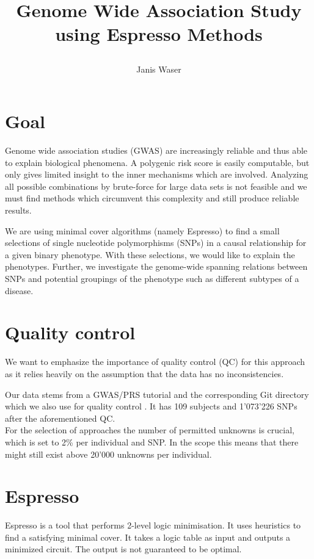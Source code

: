 \documentclass[letterpaper, 11pt]{article}
\title{	

Genome Wide Association Study using Espresso Methods
}
\author{ Janis Waser}
\begin{document}
\maketitle




\section{Goal}
\label{sec:goal}
Genome wide association studies  (GWAS) are increasingly reliable and thus able to explain biological phenomena. A polygenic risk score is easily computable, but only gives limited insight to the inner mechanisms which are involved. Analyzing all possible combinations by brute-force for large data sets is not feasible and we must find methods which circumvent this complexity and still produce reliable results.

We are using minimal cover algorithms (namely Espresso) to find a small selections of single nucleotide polymorphisms (SNPs) in a causal relationship for a given binary phenotype.  With these selections, we would like to explain the phenotypes.  Further, we investigate the genome-wide spanning relations between SNPs and potential groupings of the phenotype such as different subtypes of a disease. 


\tableofcontents
\newpage
\section {Quality control}
We want to emphasize the importance of quality control (QC) for this approach as it relies heavily on the assumption that the data has no inconsistencies. 

Our data stems from a GWAS/PRS tutorial and the corresponding Git directory which we also use for quality control \cite{tutorial}. It has 109 subjects and 1'073'226 SNPs after the aforementioned QC.  \\



For the selection of approaches the number of permitted unknowns is crucial, which is set to 2\% per individual and SNP. In the scope this means that there might still exist above 20'000 unknowns per individual. 
\section{Espresso}
Espresso is a tool that performs 2-level logic minimisation. It uses heuristics to find a satisfying minimal cover. It takes a logic table as input and outputs a minimized circuit.  The output is not guaranteed to be optimal. \\
\end{document}
